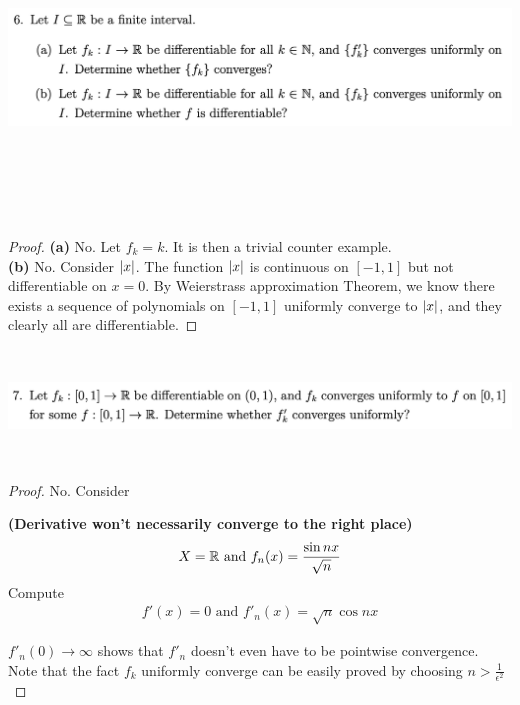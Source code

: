 \documentclass{report}
\begin{document}
\begin{question}{}{}
\includegraphics[height=8cm,width=18cm]{ahw25}
\end{question}
\begin{proof}
\textbf{(a)}
No. Let $f_k=k$. It is then a trivial counter example. \\

\textbf{(b)}
No. Consider $\left|x\right|$. The function $\left|x\right|$ is continuous on $[-1,1]$ but not differentiable on $x=0$. By Weierstrass approximation Theorem, we know there exists a sequence of polynomials on $[-1,1]$ uniformly converge to $\left|x\right|$, and they clearly all are differentiable. 
\end{proof}
\begin{question}{}{}
\includegraphics[height=3cm,width=18cm]{ahw24}
\end{question}
\begin{proof}
No. Consider 
\begin{Example}{\textbf{(Derivative won't necessarily converge to the right place)}}{}
\begin{align*}
X=\mathbb{R} \text{ and }f_n(x)=\frac{\sin nx}{\sqrt{n} }
\end{align*}
Compute 
\begin{align*}
f'(x)=0 \text{ and }f'_n(x)=\sqrt{n} \cos nx
\end{align*}
\end{Example}
$f'_n(0) \to \infty$ shows that $f'_n$ doesn't even have to be pointwise convergence. Note that the fact $f_k$ uniformly converge can be easily proved by choosing  $n>\frac{1}{\epsilon ^2}$  
\end{proof}
\end{document}
